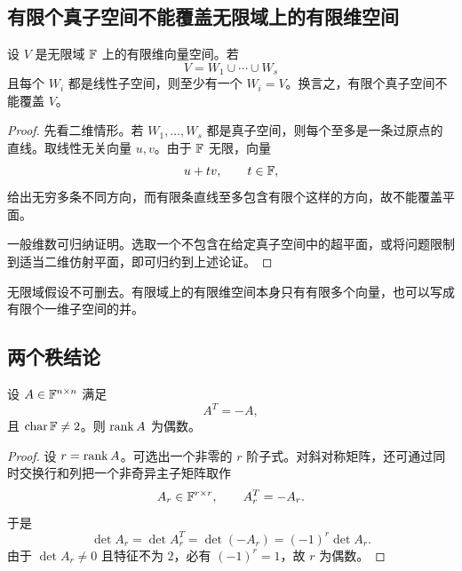 \subsection{有限个真子空间不能覆盖无限域上的有限维空间}

\begin{theorem}
设 $V$ 是无限域 $\mathbb F$ 上的有限维向量空间。若
\begin{equation}
 V=W_1\cup\cdots\cup W_s
\end{equation}
且每个 $W_i$ 都是线性子空间，则至少有一个 $W_i=V$。换言之，有限个真子空间不能覆盖 $V$。
\end{theorem}

\begin{proof}
先看二维情形。若 $W_1,\ldots,W_s$ 都是真子空间，则每个至多是一条过原点的直线。取线性无关向量 $u,v$。由于 $\mathbb F$ 无限，向量
\begin{equation}
 u+tv,\qquad t\in\mathbb F,
\end{equation}
给出无穷多条不同方向，而有限条直线至多包含有限个这样的方向，故不能覆盖平面。

一般维数可归纳证明。选取一个不包含在给定真子空间中的超平面，或将问题限制到适当二维仿射平面，即可归约到上述论证。
\end{proof}

\begin{remark}
无限域假设不可删去。有限域上的有限维空间本身只有有限多个向量，也可以写成有限个一维子空间的并。
\end{remark}

\subsection{两个秩结论}

\begin{proposition}[斜对称矩阵的秩为偶数]
设 $A\in\mathbb F^{n\times n}$ 满足
\begin{equation}
 A^T=-A,
\end{equation}
且 $\operatorname{char}\mathbb F\neq2$。则 $\operatorname{rank} A$ 为偶数。
\end{proposition}

\begin{proof}
设 $r=\operatorname{rank} A$。可选出一个非零的 $r$ 阶子式。对斜对称矩阵，还可通过同时交换行和列把一个非奇异主子矩阵取作
\begin{equation}
 A_r\in\mathbb F^{r\times r},
 \qquad A_r^T=-A_r.
\end{equation}
于是
\begin{equation}
 \det A_r=\det A_r^T=
 \det(-A_r)=(-1)^r\det A_r.
\end{equation}
由于 $\det A_r\neq0$ 且特征不为 $2$，必有 $(-1)^r=1$，故 $r$ 为偶数。
\end{proof}

